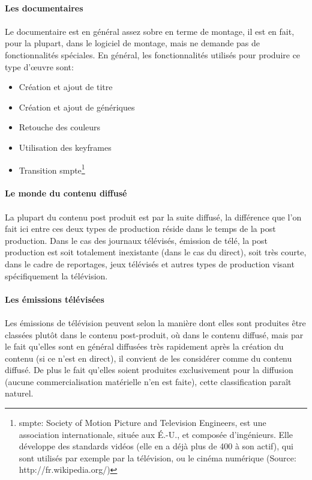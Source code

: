 \paragraph {Les documentaires}
\paragraph{}
Le documentaire est en général assez sobre en terme de montage, il est en
fait, pour la plupart, dans le logiciel de montage, mais ne demande pas
de fonctionnalités spéciales. En général, les fonctionnalités utilisés
pour produire ce type d'œuvre sont:
\begin{itemize}
  \item{Création et ajout de titre}
  \item{Création et ajout de génériques}
  \item{Retouche des couleurs}
  \item{Utilisation des keyframes}
  \item{Transition smpte\footnote{smpte: Society of Motion Picture
    and Television Engineers, est une association internationale,
    située aux É.-U., et composée d'ingénieurs. Elle développe
    des standards vidéos (elle en a déjà plus de 400 à son actif),
    qui sont utilisés par exemple par la télévision, ou le cinéma numérique
    (Source: http://fr.wikipedia.org/)}}
\end{itemize}

\paragraph{Le monde du contenu diffusé}

\paragraph{}
La plupart du contenu post produit est par la suite diffusé, la différence que l'on
fait ici entre ces deux types de production réside dans le temps de la post production.
Dans le cas des journaux télévisés, émission de télé, la post production est soit totalement
inexistante (dans le cas du direct), soit très courte, dans le cadre de reportages, jeux télévisés
et autres types de production visant spécifiquement la télévision.

\paragraph {Les émissions télévisées}
\paragraph{}
Les émissions de télévision peuvent selon la manière dont elles sont produites être
classées plutôt dans le contenu post-produit, où dans le contenu diffusé, mais par le
fait qu'elles sont en général diffusées très rapidement après la création du contenu (si ce n'est en
direct), il convient de les considérer comme du contenu diffusé. De plus le fait qu'elles soient
produites exclusivement pour la diffusion (aucune commercialisation matérielle n'en est faite), cette
classification paraît naturel.

